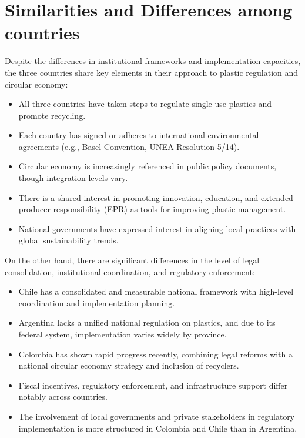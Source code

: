 \documentclass[
  12pt,
  oneside]{book}
\providecommand{\tightlist}{%
  \setlength{\itemsep}{0pt}\setlength{\parskip}{0pt}}
\begin{document}
\section{Similarities and Differences among
countries}\label{similarities-and-differences-among-countries}

Despite the differences in institutional frameworks and implementation
capacities, the three countries share key elements in their approach to
plastic regulation and circular economy:

\begin{itemize}
\tightlist
\item
  All three countries have taken steps to regulate single-use plastics
  and promote recycling.
\item
  Each country has signed or adheres to international environmental
  agreements (e.g., Basel Convention, UNEA Resolution 5/14).
\item
  Circular economy is increasingly referenced in public policy
  documents, though integration levels vary.
\item
  There is a shared interest in promoting innovation, education, and
  extended producer responsibility (EPR) as tools for improving plastic
  management.
\item
  National governments have expressed interest in aligning local
  practices with global sustainability trends.
\end{itemize}

On the other hand, there are significant differences in the level of
legal consolidation, institutional coordination, and regulatory
enforcement:

\begin{itemize}
\tightlist
\item
  Chile has a consolidated and measurable national framework with
  high-level coordination and implementation planning.
\item
  Argentina lacks a unified national regulation on plastics, and due to
  its federal system, implementation varies widely by province.
\item
  Colombia has shown rapid progress recently, combining legal reforms
  with a national circular economy strategy and inclusion of recyclers.
\item
  Fiscal incentives, regulatory enforcement, and infrastructure support
  differ notably across countries.
\item
  The involvement of local governments and private stakeholders in
  regulatory implementation is more structured in Colombia and Chile
  than in Argentina.
\end{itemize}
\end{document}
